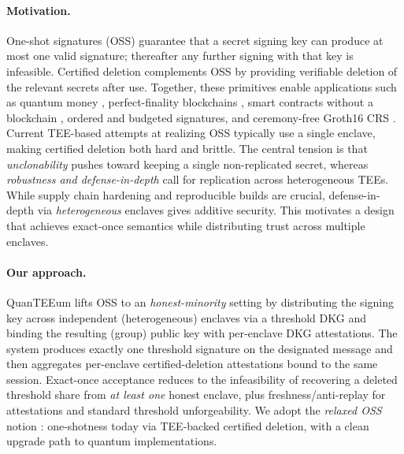 \documentclass[runningheads,orivec]{llncs}
\newcommand{\prot}{\textsf{QuanTEEum}}
\begin{document}
\paragraph{Motivation.}
One-shot signatures (OSS) guarantee that a secret signing key can produce at most one valid signature; thereafter any further signing with that key is infeasible. Certified deletion complements OSS by providing verifiable deletion of the relevant secrets after use. Together, these primitives enable applications such as quantum money \cite{shor2012quantum}, perfect-finality blockchains \cite{drake-progcrypto-oss}, smart contracts without a blockchain \cite{sattath2022quantum}, ordered and budgeted signatures, and ceremony-free Groth16 CRS \cite{groth2016size}. 
Current TEE-based attempts at realizing OSS typically use a single enclave, making certified deletion both hard and brittle. The central tension is that \emph{unclonability} pushes toward keeping a single non-replicated secret, whereas \emph{robustness and defense-in-depth} call for replication across heterogeneous TEEs. While supply chain hardening and reproducible builds are crucial, defense-in-depth via \emph{heterogeneous} enclaves gives additive security.
This motivates a design that achieves exact-once semantics while distributing trust across multiple enclaves.

\paragraph{Our approach.}
\prot{} lifts OSS to an \emph{honest-minority} setting by distributing the signing key across independent (heterogeneous) enclaves via a threshold DKG and binding the resulting (group) public key with per-enclave DKG attestations. The system produces exactly one threshold signature on the designated message and then aggregates per-enclave certified-deletion attestations bound to the same session. 
Exact-once acceptance reduces to the infeasibility of recovering a deleted threshold share from \emph{at least one} honest enclave, plus freshness/anti-replay for attestations and standard threshold unforgeability. We adopt the \emph{relaxed OSS} notion \cite{pkc-2024-34093}: one-shotness today via TEE-backed certified deletion, with a clean upgrade path to quantum implementations.
\end{document}
